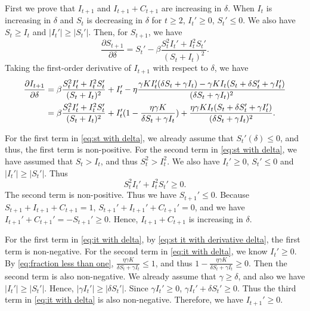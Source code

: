 \documentclass[nonblindrev, copyedit]{informs3a}
\begin{document}

First we prove that $I_{t+1}$ and $I_{t+1}+C_{t+1}$ are increasing in $\delta$.
When $I_t$ is increasing in $\delta$ and $S_t$ is decreasing in $\delta$ for $t\ge2$, $I_t'\ge 0$, $S_t'\le 0$. We also have $S_t\ge I_t$ and $|I_t'|\ge|S_t'|$. Then, for $S_{t+1}$, we have
\begin{equation}\label{eq:st with delta}
    \frac{\partial S_{t+1}}{\partial \delta}=S_{t}'-\beta\frac{S_{t}^2I_t'+I_{t}^2S_t'}{(S_{t}+I_{t})^2}.
\end{equation}
Taking the first-order derivative of $I_{t+1}$ with respect to $\delta$, we have
\begin{align}
    \frac{\partial I_{t+1}}{\partial \delta}&=\beta\frac{S_{t}^2I_t'+I_{t}^2S_t'}{(S_{t}+I_{t})^2}+I_t'-\eta\frac{\gamma KI_t'(\delta S_{t}+\gamma I_{t})-\gamma KI_t(S_{t}+\delta S_{t}'+\gamma I_{t}')}{(\delta S_{t}+\gamma I_{t})^2}\notag\\
    &=\beta\frac{S_{t}^2I_t'+I_{t}^2S_t'}{(S_{t}+I_{t})^2}+I_t'(1-\frac{\eta\gamma K}{\delta S_{t}+\gamma I_{t}})+\frac{\eta\gamma KI_t(S_{t}+\delta S_{t}'+\gamma I_{t}')}{(\delta S_{t}+\gamma I_{t})^2}.\label{eq:it with delta}
\end{align}

For the first term in \eqref{eq:st with delta}, we already assume that $S_t'(\delta)\le0$, and thus, the first term is non-positive. For the second term in \eqref{eq:st with delta}, we have assumed that $S_{t}>I_{t}$,
and thus $S_{t}^2>I_{t}^2$. We also have $I_t'\ge 0$, $S_t'\le 0$ and $|I_{t}'|\ge|S_{t}'|$. Thus
\begin{equation}\label{eq:st it with derivative delta}
    S_{t}^2I_t'+I_{t}^2S_t'\ge0.
\end{equation}
The second term is non-positive. Thus we have $S_{t+1}'\le0$. Because $S_{t+1}+I_{t+1}+C_{t+1}=1$, $S_{t+1}'+I_{t+1}'+C_{t+1}'=0$, and we have $I_{t+1}'+C_{t+1}'=-S_{t+1}'\ge0$. Hence, $I_{t+1}+C_{t+1}$ is increasing in $\delta$.


For the first term in \eqref{eq:it with delta}, by \eqref{eq:st it with derivative delta}, the first term is non-negative. For the second term in \eqref{eq:it with delta}, we know $I_t'\ge0$. By \eqref{eq:fraction less than one}, $\frac{\eta\gamma K}{\delta S_{t}+\gamma I_{t}}\le1$, and thus $1-\frac{\eta\gamma K}{\delta S_{t}+\gamma I_{t}}\ge0$. Then the second term is also non-negative. We already assume that $\gamma\ge\delta$, and also we have $|I_{t}'|\ge|S_{t}'|$. Hence, $|\gamma I_{t}'|\ge|\delta S_{t}'|$. Since $\gamma I_{t}'\ge0$, $\gamma I_{t}'+\delta S_{t}'\ge0$. Thus the third term in \eqref{eq:it with delta} is also non-negative. Therefore, we have $I_{t+1}'\ge0$.
\end{document}
